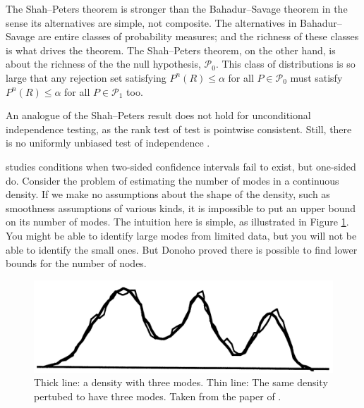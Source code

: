 The Shah--Peters theorem is stronger than the Bahadur--Savage theorem in the sense its alternatives are simple, not composite. The alternatives in Bahadur--Savage are entire classes of probability measures; and the richness of these classes is what drives the theorem. The Shah--Peters theorem, on the other hand, is about the richness of the the null hypothesis, $\mathcal{P}_{0}$. This class of distributions is so large that any rejection set satisfying $P^{n}(R)\leq\alpha$ for all $P\in\mathcal{P}_{0}$ must satisfy $P^{n}(R)\leq\alpha$ for all $P\in\mathcal{P}_{1}$ too.

An analogue of the Shah--Peters result does not hold for unconditional independence testing, as the rank test of \textcite{Hoeffding1948-nm} test is pointwise consistent. Still, there is no uniformly unbiased test of independence \parencite{Moss2020-bc}.

\textcite{Donoho1988-hg} studies conditions when two-sided confidence intervals fail to exist, but one-sided do. Consider the problem of estimating the number of modes in a continuous density. If we make no assumptions about the shape of the density, such as smoothness assumptions of various kinds, it is impossible to put an upper bound on its number of modes. The intuition here is simple, as illustrated in Figure \ref{fig:donoho}. You might be able to identify large modes from limited data, but you will not be able to identify the small ones. But Donoho proved there is possible to find lower bounds for the number of nodes. 

\begin{figure}
    \centering
    \includegraphics[scale=0.16]{chunks/donoho.png}
    \caption{Thick line: a density with three modes. Thin line: The same density pertubed to have three modes. Taken from the paper of \textcite{Donoho1988-hg}.}
    \label{fig:donoho}
\end{figure}

